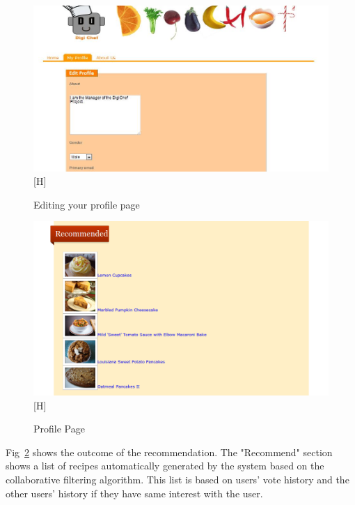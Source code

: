 \begin{figure}[H]
\includegraphics[width=1\textwidth]{editprofile}[H]
\caption{Editing your profile page}
\label{fig:editprofile}
\end{figure}



\begin{figure}[H]
\includegraphics[width=1\textwidth]{recommendations}[H]
\caption{Profile Page}
\label{fig:recommendations}
\end{figure}

Fig~\ref{fig:recommendations} shows the outcome of the recommendation. The "Recommend" section shows a list of recipes automatically generated by the system based on the collaborative filtering algorithm. This list is based on users' vote history and the other users' history if they have same interest with the user.
